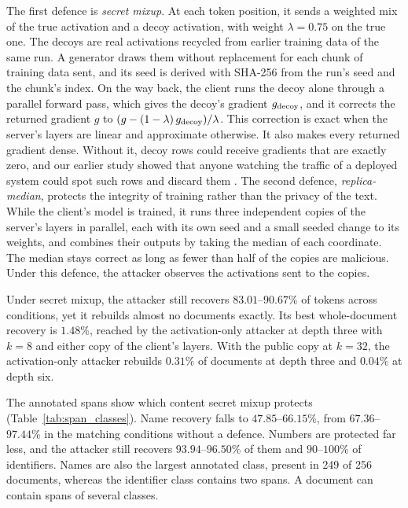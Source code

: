 \documentclass[11pt]{article}
\begin{document}
The first defence is \emph{secret mixup}. At each token position, it sends a weighted mix of the true activation and a decoy activation, with weight $\lambda = 0.75$ on the true one. The decoys are real activations recycled from earlier training data of the same run. A generator draws them without replacement for each chunk of training data sent, and its seed is derived with SHA-256 from the run's seed and the chunk's index. On the way back, the client runs the decoy alone through a parallel forward pass, which gives the decoy's gradient $g_{\rm decoy}$, and it corrects the returned gradient $g$ to $(g-(1-\lambda)\,g_{\rm decoy})/\lambda$. This correction is exact when the server's layers are linear and approximate otherwise. It also makes every returned gradient dense. Without it, decoy rows could receive gradients that are exactly zero, and our earlier study showed that anyone watching the traffic of a deployed system could spot such rows and discard them \cite{politis2026privacyfailure}. The second defence, \emph{replica-median}, protects the integrity of training rather than the privacy of the text. While the client's model is trained, it runs three independent copies of the server's layers in parallel, each with its own seed and a small seeded change to its weights, and combines their outputs by taking the median of each coordinate. The median stays correct as long as fewer than half of the copies are malicious. Under this defence, the attacker observes the activations sent to the copies.

Under secret mixup, the attacker still recovers $83.01$--$90.67\%$ of tokens across conditions, yet it rebuilds almost no documents exactly. Its best whole-document recovery is $1.48\%$, reached by the activation-only attacker at depth three with $k{=}8$ and either copy of the client's layers. With the public copy at $k{=}32$, the activation-only attacker rebuilds $0.31\%$ of documents at depth three and $0.04\%$ at depth six.

The annotated spans show which content secret mixup protects (Table~\ref{tab:span_classes}). Name recovery falls to $47.85$--$66.15\%$, from $67.36$--$97.44\%$ in the matching conditions without a defence. Numbers are protected far less, and the attacker still recovers $93.94$--$96.50\%$ of them and $90$--$100\%$ of identifiers. Names are also the largest annotated class, present in 249 of 256 documents, whereas the identifier class contains two spans. A document can contain spans of several classes.
\end{document}
